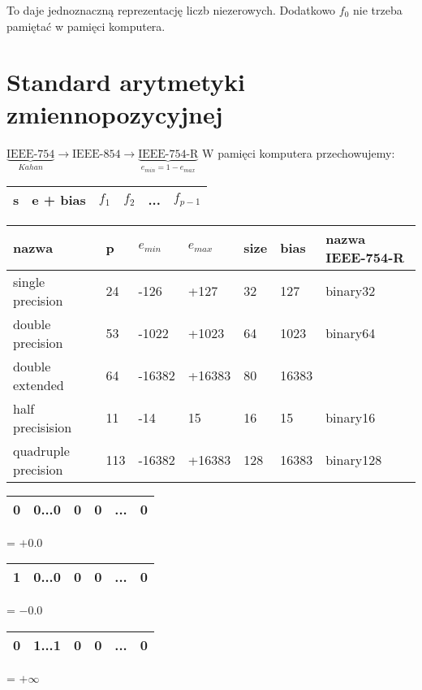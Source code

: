 \documentclass[hidelinks,a4paper,fleqn,oneside]{book}
\begin{document}
To daje jednoznaczną reprezentację liczb niezerowych. Dodatkowo $f_0$ nie trzeba pamiętać w pamięci komputera.

\section{Standard arytmetyki zmiennopozycyjnej}

$\underbrace{\textrm{IEEE-754}}_{Kahan} \rightarrow \textrm{IEEE-854} \rightarrow \underbrace{\textrm{IEEE-754-R}}_{e_{min} = 1 - e_{max}}$
W pamięci komputera przechowujemy:

\begin{tabular}{|c|c|l|l|l|c|c|c|l|c|}
	\hline
	s & \multicolumn{4}{c|}{e + bias} & $f_1$ & $f_2$ & \multicolumn{2}{c|}{...} & $f_{p-1}$ \\ \hline
\end{tabular}


\begin{longtable}[c]{l|l|l|l|l|l|l}
	nazwa               & p   & $e_{min}$ & $e_{max}$ & size & bias  & nazwa IEEE-754-R \\ \hline
	\endfirsthead
	\endhead
	single precision    & 24  & -126      & +127      & 32   & 127   & binary32         \\ \hline
	double precision    & 53  & -1022     & +1023     & 64   & 1023  & binary64         \\ \hline
	double extended     & 64  & -16382    & +16383    & 80   & 16383 &                  \\ \hline
	half precisision    & 11  & -14       & 15        & 16   & 15    & binary16         \\ \hline
	quadruple precision & 113 & -16382    & +16383    & 128  & 16383 & binary128        
\end{longtable}

\begin{tabular}{|c|c|l|l|l|c|c|c|l|c|}
	\hline
	0 & \multicolumn{4}{c|}{0...0} & 0 & 0 & \multicolumn{2}{c|}{...} & 0 \\ \hline
\end{tabular} = $+0.0$

\begin{tabular}{|c|c|l|l|l|c|c|c|l|c|}
	\hline
	1 & \multicolumn{4}{c|}{0...0} & 0 & 0 & \multicolumn{2}{c|}{...} & 0 \\ \hline
\end{tabular} = $-0.0$

\begin{tabular}{|c|c|l|l|l|c|c|c|l|c|}
	\hline
	0 & \multicolumn{4}{c|}{1...1} & 0 & 0 & \multicolumn{2}{c|}{...} & 0 \\ \hline
\end{tabular} = $+\infty$
\end{document}
